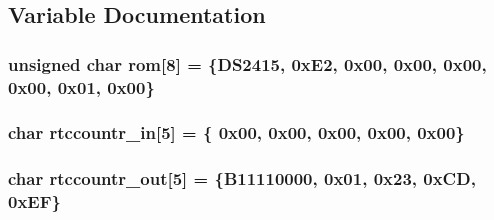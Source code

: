 \subsection{Variable Documentation}
\hypertarget{OWGeneric_8ino_a8beb78e2b3f2cb6e34f34861a875ca0b}{
\subsubsection[{rom}]{\setlength{\rightskip}{0pt plus 5cm}unsigned char rom\mbox{[}8\mbox{]} = \{D\-S2415, 0x\-E2, 0x00, 0x00, 0x00, 0x00, 0x01, 0x00\}}}\label{OWGeneric_8ino_a8beb78e2b3f2cb6e34f34861a875ca0b}
\hypertarget{OWGeneric_8ino_a81a94fdcf5fd0721c26e50dd4cd32b1e}{
\subsubsection[{rtccountr\-\_\-in}]{\setlength{\rightskip}{0pt plus 5cm}char rtccountr\-\_\-in\mbox{[}5\mbox{]} = \{ 0x00, 0x00, 0x00, 0x00, 0x00\}}}\label{OWGeneric_8ino_a81a94fdcf5fd0721c26e50dd4cd32b1e}
\hypertarget{OWGeneric_8ino_ac150db4005f4bac8510f9e697f1c291a}{
\subsubsection[{rtccountr\-\_\-out}]{\setlength{\rightskip}{0pt plus 5cm}char rtccountr\-\_\-out\mbox{[}5\mbox{]} = \{B11110000, 0x01, 0x23, 0x\-C\-D, 0x\-E\-F\}}}\label{OWGeneric_8ino_ac150db4005f4bac8510f9e697f1c291a}

